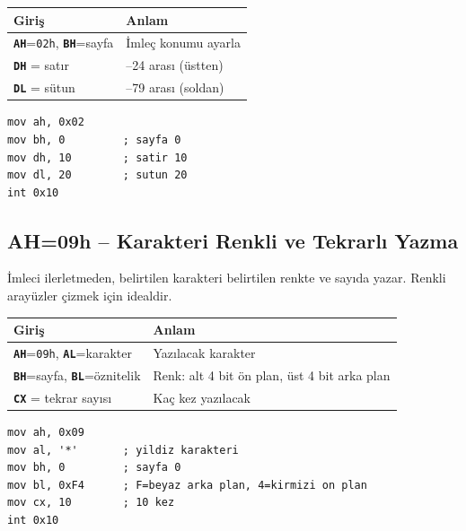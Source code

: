 \documentclass[11pt,a4paper]{article}
\newcommand{\reg}[1]{\texttt{\color{anaMavi}\textbf{#1}}}
\newcommand{\hx}[1]{\texttt{\color{turuncu}#1}}
\begin{document}
\begin{center}
\begin{tabularx}{\textwidth}{@{}l >{\raggedright\arraybackslash}X@{}}
\toprule
\rowcolor{acikMavi}\color{anaMavi}\textbf{Giriş} & \color{anaMavi}\textbf{Anlam} \\
\midrule
\reg{AH}=\hx{02h}, \reg{BH}=sayfa & İmleç konumu ayarla \\
\reg{DH} = satır & 0--24 arası (üstten) \\
\reg{DL} = sütun & 0--79 arası (soldan) \\
\bottomrule
\end{tabularx}
\end{center}

\begin{ornekkutu}
\begin{lstlisting}
mov ah, 0x02
mov bh, 0         ; sayfa 0
mov dh, 10        ; satir 10
mov dl, 20        ; sutun 20
int 0x10
\end{lstlisting}
\end{ornekkutu}

\subsection{AH=09h -- Karakteri Renkli ve Tekrarlı Yazma}

İmleci ilerletmeden, belirtilen karakteri belirtilen renkte ve sayıda yazar.
Renkli arayüzler çizmek için idealdir.

\begin{center}
\begin{tabularx}{\textwidth}{@{}l >{\raggedright\arraybackslash}X@{}}
\toprule
\rowcolor{acikMavi}\color{anaMavi}\textbf{Giriş} & \color{anaMavi}\textbf{Anlam} \\
\midrule
\reg{AH}=\hx{09h}, \reg{AL}=karakter & Yazılacak karakter \\
\reg{BH}=sayfa, \reg{BL}=öznitelik & Renk: alt 4 bit ön plan, üst 4 bit arka plan \\
\reg{CX} = tekrar sayısı & Kaç kez yazılacak \\
\bottomrule
\end{tabularx}
\end{center}

\begin{ornekkutu}
\begin{lstlisting}
mov ah, 0x09
mov al, '*'       ; yildiz karakteri
mov bh, 0         ; sayfa 0
mov bl, 0xF4      ; F=beyaz arka plan, 4=kirmizi on plan
mov cx, 10        ; 10 kez
int 0x10
\end{lstlisting}
\end{ornekkutu}
\end{document}
